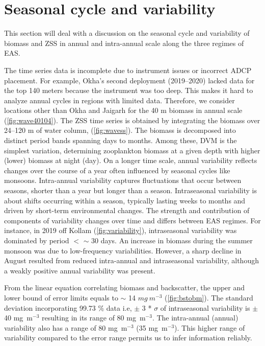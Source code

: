 \documentclass{article}
\begin{document}
	\section{Seasonal cycle and variability}
	\label{sec:seasonalcyclezss}
	This section will deal with a discussion on the seasonal cycle and variability of biomass and ZSS in annual and intra-annual scale along the three regimes of EAS. 

	The time series data is incomplete due to instrument issues or incorrect ADCP placement. For example, Okha's second deployment (2019--2020) lacked data for the top 140 meters because the instrument was too deep. This makes it hard to analyze annual cycles in regions with limited data. Therefore, we consider locations other than Okha and Jaigarh for the 40 m biomass in annual scale (\cref{fig:wave40104}). The ZSS time series is obtained by integrating the biomass over 24--120 m of water column, (\cref{fig:wavess}). 
	The biomass is decomposed into distinct period bands spanning days to months. Among these, DVM is the simplest variation, determining zooplankton biomass at a given depth with higher (lower) biomass at night (day). On a longer time scale, annual variability reflects changes over the course of a year often influenced by seasonal cycles like monsoons. Intra-annual variability captures fluctuations that occur between seasons, shorter than a year but longer than a season. Intraseasonal variability is about shifts occurring within a season, typically lasting weeks to months and driven by short-term environmental changes. The strength and contribution of components of variability changes over time  and differs between EAS regimes. For instance, in 2019 off Kollam (\cref{fig:variability}), intraseasonal variability was dominated by period $<$ $\sim$ 30 days. An increase in biomass during the summer monsoon was due to low-frequency variabilities. However, a sharp decline in August resulted from reduced intra-annual and intraseasonal variability, although a weakly positive annual variability was present.  
	
	From the linear equation correlating biomass and backscatter, the upper and lower bound of error limits equals to $\sim$  14 $ mg\ m^{-3}$ (\cref{fig:bstobm}). The standard deviation incorporating 99.73 \% data i.e, $\pm$ 3 * $\sigma$ of intraseasonal variability is $\pm$ 40 mg~m$^{-3}$ resulting in its range of 80 mg~m$^{-3}$. The intra-annual (annual) variability also has a range of 80 mg~m$^{-3}$ (35 mg~m$^{-3}$). This higher range of variability compared to the error range permits us to infer information reliably. 
	
\end{document}
